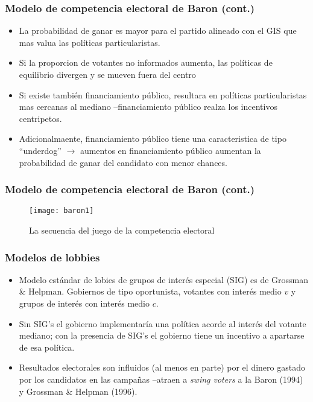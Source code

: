 \documentclass[14pt,aspectratio=169]{beamer}
\begin{document}
\begin{frame}\frametitle{Modelo de competencia electoral de Baron
    (cont.)}
\begin{itemize}\itemsep 15pt
\item La probabilidad de ganar es mayor para el partido alineado con
  el GIS que mas valua las políticas particularistas.
\item Si la proporcion de votantes no informados aumenta, las
  políticas de equilibrio divergen y se mueven fuera del centro
\item Si existe también financiamiento público, resultara en políticas
  particularistas mas cercanas al mediano --financiamiento público
  realza los incentivos centripetos.
\item Adicionalmaente, financiamiento público tiene una caracteristica
  de tipo ``underdog'' $\longrightarrow$ aumentos en financiamiento
  público aumentan la probabilidad de ganar del candidato con menor
  chances. 
\end{itemize}
\end{frame}



\begin{frame}\frametitle{Modelo de competencia electoral de Baron (cont.)}
\begin{figure}[htbp]
    \centering \vspace{-3.5cm}
    \texttt{[image: baron1]}
    \caption{La secuencia del juego de la competencia electoral}
    \label{fig:baron1}
  \end{figure}
\end{frame}



\begin{frame}
\frametitle{Modelos de lobbies}
\begin{itemize} \itemsep 10pt
\item Modelo estándar de lobies de grupos de interés
  especial (SIG) es de Grossman \& Helpman. Gobiernos de
  tipo oportunista, votantes con interés medio $v$ y grupos de interés
  con interés medio $c$. 
\item Sin SIG's el gobierno implementaría una
  política acorde al interés del votante mediano; con la presencia de
  SIG's el gobierno tiene un incentivo a apartarse de esa política. 
\item Resultados electorales son influidos (al menos en parte) por
  el dinero gastado por los candidatos en las campañas --atraen a
\textit{swing voters} a la Baron (1994) y Grossman \& Helpman (1996).
\end{itemize}
\end{frame}
\end{document}
